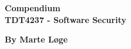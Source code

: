\begin{titlepage}
\begin{center}

{\Huge \bf Compendium} \\[1.0cm]
{\Large \bf TDT4237 - Software Security}\\[1.0cm]

\vspace{16cm}

\centering
{\bf By Marte Løge}



\end{center}
\end{titlepage}